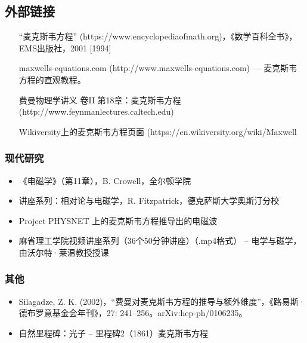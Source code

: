 \subsection{外部链接}
\begin{itemize}
\item  [“麦克斯韦方程”](https://www.encyclopediaofmath.org)，《数学百科全书》，EMS出版社，2001 [1994]
\item  [maxwells-equations.com](http://www.maxwells-equations.com) — 麦克斯韦方程的直观教程。
\item  [费曼物理学讲义 卷II 第18章：麦克斯韦方程](http://www.feynmanlectures.caltech.edu)
\item  [Wikiversity上的麦克斯韦方程页面](https://en.wikiversity.org/wiki/Maxwell%
\end{itemize}
\subsubsection{现代研究}
\begin{itemize}
\item 《电磁学》（第11章），B. Crowell，全尔顿学院
\item 讲座系列：相对论与电磁学，R. Fitzpatrick，德克萨斯大学奥斯汀分校
\item Project PHYSNET 上的麦克斯韦方程推导出的电磁波
\item 麻省理工学院视频讲座系列（36个50分钟讲座）（.mp4格式） – 电学与磁学，由沃尔特·莱温教授授课
\end{itemize}
\subsubsection{其他}
\begin{itemize}
\item Silagadze, Z. K. (2002)，“费曼对麦克斯韦方程的推导与额外维度”，《路易斯·德布罗意基金会年刊》，27: 241–256。arXiv:hep-ph/0106235。
\item 自然里程碑：光子 – 里程碑2（1861）麦克斯韦方程
\end{itemize}
